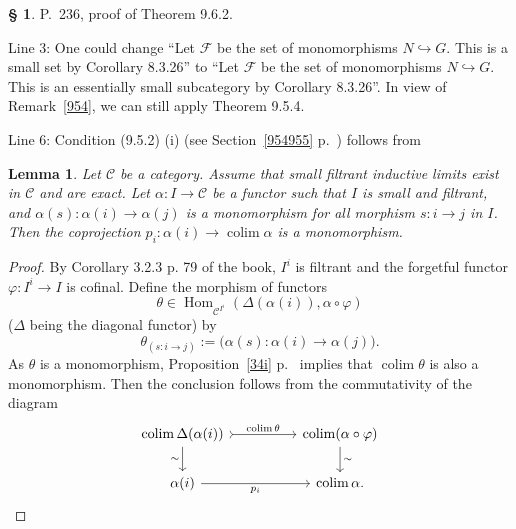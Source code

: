 \documentclass[12pt]{article}
\newtheorem{lem}[thm]{Lemma}
\theoremstyle{remark}
\theoremstyle{definition}
\newtheorem{s}[thm]{\S}
\newcommand{\cc}{\mathcal}
\newcommand{\C}{\mathcal C}
\newcommand{\pp}{\varphi}
\newcommand{\incl}{\hookrightarrow}
\DeclareMathOperator*{\colim}{colim}
\DeclareMathOperator{\Hom}{Hom}
\begin{document}
\begin{s}\label{962}
P.~236, proof of Theorem 9.6.2. 

Line 3: One could change ``Let $\cc F$ be the set of monomorphisms $N\incl G$. This is a small set by Corollary 8.3.26'' to ``Let $\cc F$ be the set of monomorphisms $N\incl G$. This is an essentially small subcategory by Corollary 8.3.26''. In view of Remark~\ref{954}, we can still apply Theorem 9.5.4.

Line 6: Condition (9.5.2) (i) (see Section~\ref{954955} p.~\pageref{954955}) follows from 
%
\begin{lem}\label{952i}
Let $\C$ be a category. Assume that small filtrant inductive limits exist in $\C$ and are exact. Let $\alpha:I\to\C$ be a functor such that $I$ is small and filtrant, and $\alpha(s):\alpha(i)\to\alpha(j)$ is a monomorphism for all morphism $s:i\to j$ in $I$. Then the coprojection $p_i:\alpha(i)\to\colim\alpha$ is a monomorphism.
\end{lem}
%
\begin{proof}
By Corollary 3.2.3 p. 79 of the book, $I^i$ is filtrant and the forgetful functor $\pp:I^i\to I$ is cofinal. Define the morphism of functors 
$$
\theta\in\Hom_{\C^{I^i}}(\Delta(\alpha(i)),\alpha\circ\pp)
$$ 
($\Delta$ being the diagonal functor) by 
$$
\theta_{(s:i\to j)}:=\big(\alpha(s):\alpha(i)\to\alpha(j)\big). 
$$ 
As $\theta$ is a monomorphism, Proposition~\ref{34i} p.~\pageref{34i} implies that $\colim\theta$ is also a monomorphism. Then the conclusion follows from the commutativity of the diagram 
$$
\begin{tikzcd}
\colim\Delta(\alpha(i))\ar{d}[swap]{\sim}\ar[tail]{rr}{\colim\theta}&&\colim(\alpha\circ\pp)\ar{d}{\sim}\\ 
\alpha(i)\ar{rr}[swap]{p_i}&&\colim\alpha.
\end{tikzcd}
$$
\end{proof}
\end{s}

\end{document}
